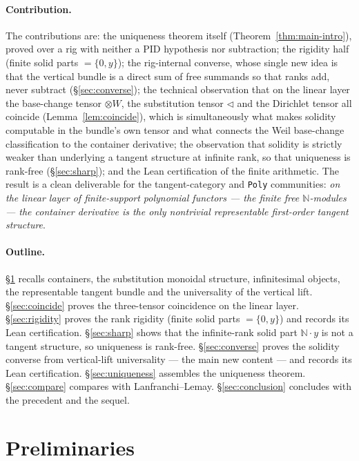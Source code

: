 \documentclass[11pt]{article}
\theoremstyle{definition}
\newcommand{\N}{\mathbb{N}}
\begin{document}
\paragraph{Contribution.}
The contributions are: the uniqueness theorem itself (Theorem~\ref{thm:main-intro}), proved over a
rig with neither a PID hypothesis nor subtraction; the rigidity half (finite solid parts
$=\{0,y\}$); the rig-internal converse, whose single new idea is that the vertical bundle is a direct
sum of free summands so that ranks add, never subtract (\S\ref{sec:converse}); the technical
observation that on the linear layer the base-change tensor $\otimes W$, the substitution tensor
$\lhd$ and the Dirichlet tensor all coincide (Lemma~\ref{lem:coincide}), which is simultaneously
what makes solidity computable in the bundle's own tensor and what connects the Weil base-change
classification to the container derivative; the observation that solidity is strictly weaker than
underlying a tangent structure at infinite rank, so that uniqueness is rank-free
(\S\ref{sec:sharp}); and the Lean certification of the finite arithmetic. The result is a clean
deliverable for the tangent-category and \texttt{Poly} communities: \emph{on the linear layer of
finite-support polynomial functors --- the finite free $\N$-modules --- the container derivative is
the only nontrivial representable first-order tangent structure}.

\paragraph{Outline.}
\S\ref{sec:prelim} recalls containers, the substitution monoidal structure, infinitesimal objects,
the representable tangent bundle and the universality of the vertical lift. \S\ref{sec:coincide}
proves the three-tensor coincidence on the linear layer. \S\ref{sec:rigidity} proves the rank
rigidity (finite solid parts $=\{0,y\}$) and records its Lean certification. \S\ref{sec:sharp}
shows that the infinite-rank solid part $\N\cdot y$ is not a tangent structure, so uniqueness is
rank-free. \S\ref{sec:converse} proves the solidity converse from vertical-lift
universality --- the main new content --- and records its Lean certification.
\S\ref{sec:uniqueness} assembles the uniqueness theorem. \S\ref{sec:compare} compares with
Lanfranchi--Lemay. \S\ref{sec:conclusion} concludes with the precedent and the sequel.

\section{Preliminaries}\label{sec:prelim}
\end{document}
